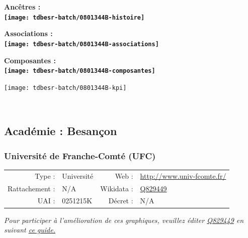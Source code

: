 \documentclass[12pt,french,]{article}
\begin{document}
\vspace{1cm}  
\begin{minipage}[b]{0.50\textwidth}\begin{center} \bf Ancêtres : \\  
\texttt{[image: tdbesr-batch/0801344B-histoire]} \end{center}\end{minipage}\begin{minipage}[b]{0.50\textwidth}\begin{center} \bf Associations : \\  
\texttt{[image: tdbesr-batch/0801344B-associations]} \end{center}\end{minipage}

\hrulefill

\begin{center} \bf Composantes : \\  
\texttt{[image: tdbesr-batch/0801344B-composantes]} \end{center}

\begin{center}\texttt{[image: tdbesr-batch/0801344B-kpi]} \end{center}\checkoddpage

\ifoddpage ~\newpage \fi   

\hypertarget{acaduxe9mie-besanuxe7on}{%
\subsection{Académie : Besançon}\label{acaduxe9mie-besanuxe7on}}

\hypertarget{universituxe9-de-franche-comtuxe9-ufc}{%
\subsubsection{Université de Franche-Comté
(UFC)}\label{universituxe9-de-franche-comtuxe9-ufc}}

\begin{tabular*}{\textwidth}{rp{5cm}rl}  
\hline  
Type : & Université & Web : &\href{http://www.univ-fcomte.fr/}{http://www.univ-fcomte.fr/} \\  
Rattachement : & N/A & Wikidata : & \href{https://www.wikidata.org/entity/Q829449}{Q829449} \\  
UAI : & 0251215K & Décret : & N/A \\  
\hline  
\end{tabular*}

\textit{\scriptsize Pour participer à l'amélioration de ces graphiques, veuillez éditer  \href{https://www.wikidata.org/entity/Q829449}{Q829449}  en suivant \href{https://github.com/cpesr/wikidataESR/blob/master/Rmd/wikidataESR.md}{ce guide.}}
\end{document}
